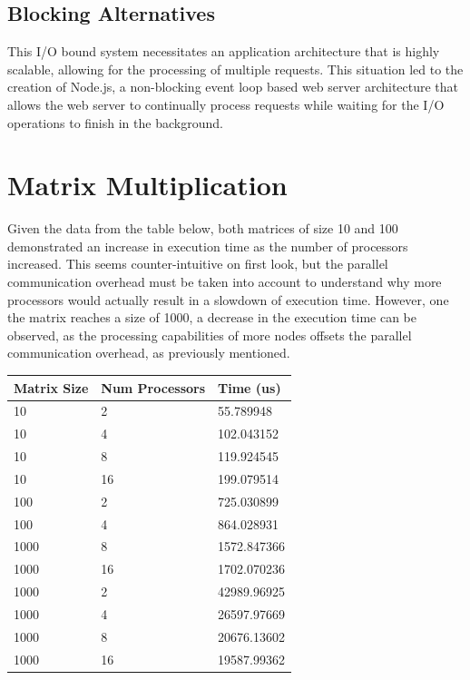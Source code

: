 \documentclass[12pt, letterpaper]{report}
\begin{document}
\subsection{Blocking Alternatives}

This I/O bound system necessitates an application architecture that is highly scalable, allowing for the processing of multiple requests. This situation led  to the creation of Node.js, a non-blocking event loop based web server architecture that allows the web server to continually process requests while waiting for the I/O operations to finish in the background.

\section{Matrix Multiplication}

Given the data from the table below, both matrices of size 10 and 100 demonstrated an increase in execution time as the number of processors increased. This seems counter-intuitive on first look, but the parallel communication overhead must be taken into account to understand why more processors would actually result in a slowdown of execution time. However, one the matrix reaches a size of 1000, a decrease in the execution time can be observed, as the processing capabilities of more nodes offsets the parallel communication overhead, as previously mentioned. 

\begin{center}
	\begin{tabular}{ |l|l|l| } 
		\hline
		Matrix Size & Num Processors & Time (us) \\
		\hline
		10 & 2 & 55.789948 \\
		\hline
		10 & 4 & 102.043152 \\
		\hline
		10 & 8 & 119.924545 \\
		\hline
		10 & 16 & 199.079514 \\
		\hline
		100 & 2 & 725.030899 \\
		\hline
		100 & 4 & 864.028931 \\
		\hline
		1000 & 8 & 1572.847366 \\
		\hline
		1000 & 16 & 1702.070236 \\
		\hline
		1000 & 2 & 42989.96925 \\
		\hline
		1000 & 4 & 26597.97669 \\
		\hline
		1000 & 8 & 20676.13602 \\
		\hline
		1000 & 16 & 19587.99362 \\
		\hline
	\end{tabular}
\end{center}
\end{document}
